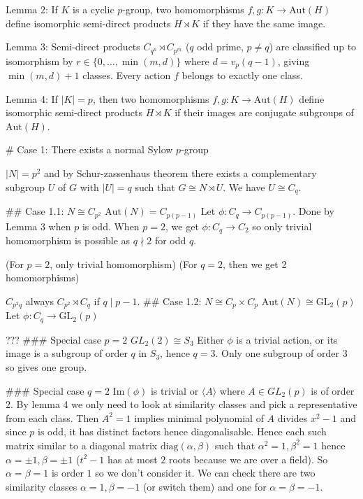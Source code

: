 Lemma 2: If $K$ is a cyclic $p$-group, two homomorphisms $f, g : K → \text{Aut}(H)$ define
isomorphic semi-direct products $H \rtimes K$ if they have the same image.

Lemma 3: Semi-direct products $C_{q^n} ⋊ C_{p^m}$ ($q$ odd prime, $p ≠ q$) are classified up to
isomorphism by $r ∈ \{0, …, \min(m, d)\}$ where $d = v_p(q - 1)$, giving $\min(m, d) + 1$ classes. Every action $f$ belongs to exactly one class.

Lemma 4: If $|K| = p$, then two homomorphisms $f, g : K → \text{Aut}(H)$ define isomorphic semi-direct products $H \rtimes K$ if their images are conjugate subgroups of $\text{Aut}(H)$.

# Case 1: There exists a normal Sylow $p$-group

$|N| = p^2$ and by Schur-zassenhaus theorem there exists a complementary subgroup $U$ of $G$ with $|U| = q$ such that $G \cong N \rtimes U$. We have $U \cong C_q$.

## Case 1.1: $N \cong C_{p^2}$
$\text{Aut}(N) = C_{p(p-1)}$
Let $\phi : C_q \rightarrow C_{p(p-1)}$. Done by Lemma 3 when $p$ is odd. When $p = 2$, we get $\phi : C_q \rightarrow C_2$ so only trivial homomorphism is possible as $q \nmid 2$ for odd $q$.

(For $p = 2$, only trivial homomorphism)
(For $q = 2$, then we get 2 homomorphisms)

$C_{p^2 q}$ always
$C_{p^2} \rtimes C_q$ if $q \mid p - 1$.
## Case 1.2: $N \cong C_p \times C_p$
$\text{Aut}(N) \cong \text{GL}_2(p)$
Let $\phi : C_q \rightarrow \text{GL}_2(p)$

???
### Special case $p = 2$
$GL_2(2) \cong S_3$
Either $\phi$ is a trivial action, or its image is a subgroup of order $q$ in $S_3$, hence $q = 3$. Only one subgroup of order $3$ so gives one group.

### Special case $q = 2$
$\text{Im}(\phi)$ is trivial or $\langle A \rangle$ where $A \in GL_2(p)$ is of order $2$. By lemma 4 we only need to look at similarity classes and pick a representative from each class. Then $A^2 = 1$ implies minimal polynomial of $A$ divides $x^2 - 1$ and since $p$ is odd, it has distinct factors hence diagonalisable. Hence each such matrix similar to a diagonal matrix $\text{diag}(\alpha, \beta)$ such that $\alpha^2 = 1, \beta^2 = 1$ hence $\alpha = \pm 1, \beta = \pm 1$ ($t^2 - 1$ has at most $2$ roots because we are over a field). So $\alpha = \beta = 1$ is order $1$ so we don't consider it. We can check there are two similarity classes $\alpha = 1, \beta = -1$ (or switch them) and one for $\alpha = \beta = -1$.

